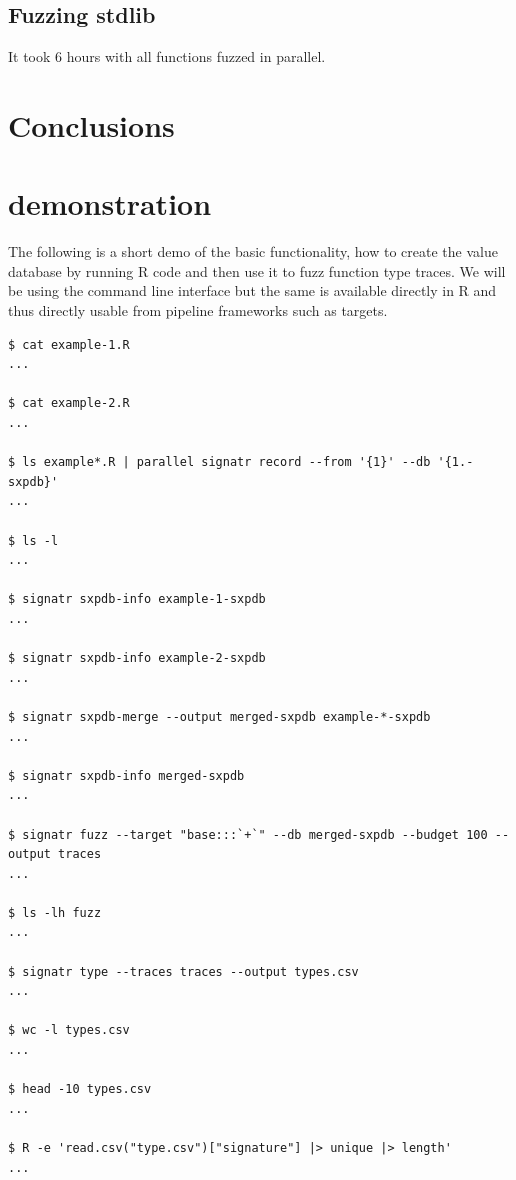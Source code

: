 \documentclass[sigplan,anonymous,review]{acmart}
\begin{document}
\subsection{Fuzzing stdlib}

%
It took 6 hours with all functions fuzzed in parallel.



\section{Conclusions}
\label{sec:conclusions}




\appendix

\section{\tool demonstration}

The following is a short demo of the basic \tool functionality, \Ie how to create the value database by running R code and then use it to fuzz function type traces.
We will be using the command line interface but the same is available directly in R and thus directly usable from pipeline frameworks such as targets.


\begin{lstlisting}
$ cat example-1.R
...

$ cat example-2.R
...

$ ls example*.R | parallel signatr record --from '{1}' --db '{1.-sxpdb}'
...

$ ls -l
...

$ signatr sxpdb-info example-1-sxpdb
...

$ signatr sxpdb-info example-2-sxpdb
...

$ signatr sxpdb-merge --output merged-sxpdb example-*-sxpdb
...

$ signatr sxpdb-info merged-sxpdb
...

$ signatr fuzz --target "base:::`+`" --db merged-sxpdb --budget 100 --output traces
...

$ ls -lh fuzz
...

$ signatr type --traces traces --output types.csv
...

$ wc -l types.csv
...

$ head -10 types.csv
...

$ R -e 'read.csv("type.csv")["signature"] |> unique |> length'
...

\end{lstlisting}
\end{document}
